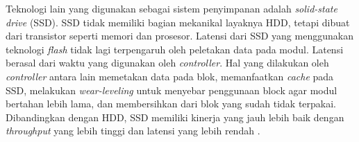 Teknologi lain yang digunakan sebagai sistem penyimpanan adalah \textit{solid-state drive} (SSD). SSD tidak memiliki bagian mekanikal layaknya HDD, tetapi dibuat dari transistor seperti memori dan prosesor. Latensi dari SSD yang menggunakan teknologi \textit{flash} tidak lagi terpengaruh oleh peletakan data pada modul. Latensi berasal dari waktu yang digunakan oleh \textit{controller}. Hal yang dilakukan oleh \textit{controller} antara lain memetakan data pada blok, memanfaatkan \textit{cache} pada SSD, melakukan \textit{wear-leveling} untuk menyebar penggunaan block agar modul bertahan lebih lama, dan membersihkan dari blok yang sudah tidak terpakai. Dibandingkan dengan HDD, SSD memiliki kinerja yang jauh lebih baik dengan \textit{throughput} yang lebih tinggi dan latensi yang lebih rendah \parencite{arpaci2018operating}.
